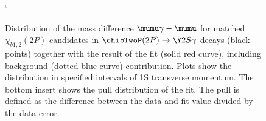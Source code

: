 \begin{figure}[H]
{\begin{picture}
  \end{picture}
  }
  \caption {\small 
    Distribution of the mass difference $\mumu \gamma - \mumu$ for matched
    $\chi_{b1,2}(2P)$ candidates in $\chibTwoP(2P) \to \Y2S \gamma$ decays
    (black points) together with the result of the fit (solid red curve),
    including background (dotted blue curve) contribution. Plots show the
    distribution in specified intervals of \Y1S transverse momentum. The bottom
    insert shows the  pull distribution of the fit. The pull is defined as the
    difference  between the data and fit value divided by the data error. }`
  \label{fig:mc:ups2s:fits2p}
\end{figure}